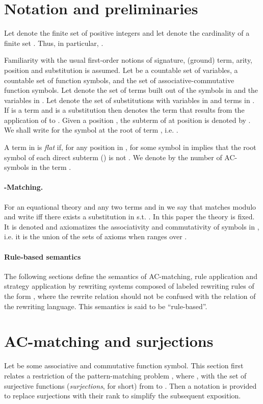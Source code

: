 \documentclass[submission,copyright,creativecommons]{eptcs}
\numberwithin{subcase}{case}
\begin{document}
\section{Notation and preliminaries}
\label{Notations:Sec}
Let  denote the finite set of
positive integers  and let  denote the cardinality of
a finite set .  Thus, in particular, .

Familiarity with the usual first-order notions of signature, (ground) term,
arity, position and substitution is assumed. Let  be a countable set
of variables,  a countable set of function symbols, and
 the set of associative-commutative
function symbols. Let 
denote the set of terms built out of the symbols in  and the
variables in . Let  denote the set of substitutions
 with variables  in
 and terms  in . If  is a term
and  is a
 substitution then  denotes the term that results from the application
 of  to . Given a position , the subterm of  at position
  is denoted by . We shall write  for the
 symbol at the root of term , i.e. .

A term  in  is \emph{flat} if, for any
position  in ,  for some symbol  in
 implies that the root symbol  of each
direct subterm  () is not . We denote  by
 the number of AC-symbols in the term .

\paragraph{-Matching.}
For an equational theory  and any two terms  and   in
 we say that  matches  modulo  and write
 iff there exists a substitution  in
 s.t. . In this paper the theory
 is fixed. It is denoted  and axiomatizes the associativity and
commutativity of symbols in ,
i.e. it is the union of the sets of axioms 
when  ranges over .  


\paragraph{Rule-based semantics}
The following sections define the semantics of AC-matching, rule application and
strategy application by rewriting systems composed of labeled rewriting rules of
the form , where the rewrite relation
 should not be confused with the relation  of the rewriting
language. This semantics is said to be ``rule-based''.


\section{AC-matching and surjections}
\label{surj:sec}
Let  be some associative and commutative function
symbol. This section first relates a restriction of the pattern-matching problem
, where  ,
with the set  of surjective functions (\emph{surjections}, for short)
from  to .
Then a notation is provided  to replace surjections with their rank to simplify
the subsequent exposition.
\end{document}

